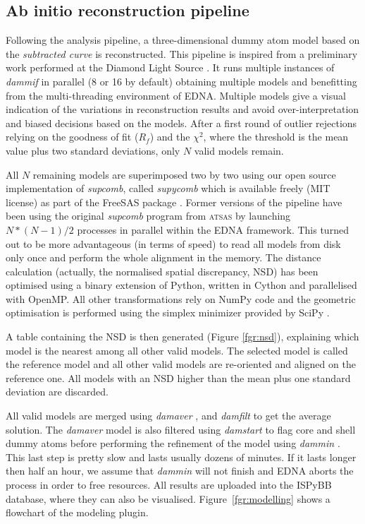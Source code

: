 \documentclass[preprint,pdf]{iucr}              %
\begin{document}
\subsection{Ab initio reconstruction pipeline}
\label{abinitio}
Following the analysis pipeline, a three-dimensional dummy atom model based
on the \textit{subtracted curve} is reconstructed.
This pipeline is inspired from a preliminary work
performed at the Diamond Light Source \cite{DiamondSE}.
It runs multiple instances of \textit{dammif} in parallel (8 or 16 by default)
obtaining multiple models \cite{dammif} and benefitting from 
the multi-threading environment of EDNA.
Multiple models give a visual indication of the variations in
reconstruction results and avoid over-interpretation and biased decisions
based on the models.
After a first round of outlier rejections relying on the goodness of fit
($R_{f}$) and the $\chi^{2}$, where the threshold is the mean value plus two
standard deviations, only $N$ valid models remain.

All $N$ remaining models are superimposed two by two using
our open source implementation of \textit{supcomb}, called
\textit{supycomb} which is available freely (MIT license) as part of the
FreeSAS package \cite{freesas}.
Former versions of the pipeline have been using the original
\textit{supcomb} \cite{supcomb} program from \textsc{atsas} by launching
$N*(N-1)/2$ processes in parallel within the EDNA framework.
This turned out to be more advantageous (in terms of speed) to read all models
from disk only once and perform the whole alignment in the memory.
The distance calculation (actually, the normalised spatial discrepancy, NSD)
has been optimised using a binary extension of Python, written in Cython
\cite{cython} and parallelised with OpenMP.
All other transformations rely on NumPy \cite{numpy} code and the geometric
optimisation is performed using the simplex minimizer provided by SciPy
\cite{scipy}.

A table containing the NSD is then generated
(Figure \ref{fgr:nsd}), explaining which model is the nearest among all
other valid models. 
The selected model is called the reference model and all other valid
models are re-oriented and aligned on the reference one.
All models with an NSD higher than the mean plus one standard deviation are
discarded.

All valid models are merged using \textit{damaver} \cite{damaver},
and \textit{damfilt} to get the average solution. 
The \textit{damaver} model is also filtered using \textit{damstart} to flag
core and shell dummy atoms before performing the refinement of the model using
\textit{dammin} \cite{dammin}.
This last step is pretty slow and lasts usually dozens of minutes. 
If it lasts longer then half an hour, we assume that \textit{dammin} will not finish and 
EDNA aborts the process in order to free resources. 
All results are uploaded into the ISPyBB database, where they can also be
visualised. 
Figure~\ref{fgr:modelling} shows a flowchart of the modeling plugin.
\end{document}
